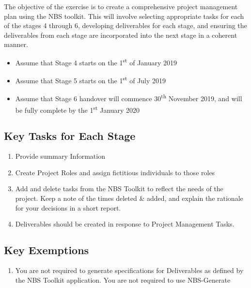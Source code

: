 The objective of the exercise is to create a comprehensive project management plan using the NBS toolkit. This will involve selecting appropriate tasks for each of the stages 4 through 6, developing deliverables for each stage, and ensuring the deliverables from each stage are incorporated into the next stage in a coherent manner.
\begin{itemize}
	\item Assume that Stage 4 starts on the 1\textsuperscript{st} of January 2019
	\item Assume that Stage 5 starts on the 1\textsuperscript{st} of July 2019
	\item Assume that Stage 6 handover will commence 30\textsuperscript{th} November 2019, and will be fully complete by the 1\textsuperscript{st} January 2020
\end{itemize}

\subsection*{Key Tasks for Each Stage}
\begin{enumerate}
	\item Provide summary Information
	\item Create Project Roles and assign fictitious individuals to those roles
	\item Add and delete tasks from the NBS Toolkit to reflect the needs of the project. Keep a note of the times deleted \& added, and explain the rationale for your decisions in a short report.
	\item Deliverables should be created in response to Project Management Tasks.
\end{enumerate}



\subsection*{Key Exemptions}

\begin{enumerate}
	\item You are not required to generate specifications for Deliverables as defined by the NBS Toolkit application. You are not required to use NBS-Generate
\end{enumerate}





\newpage
